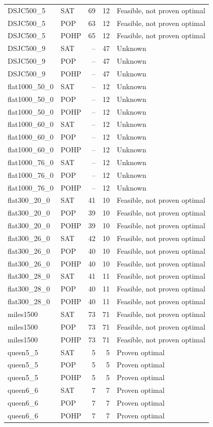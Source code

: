 \begin{longtable}{llrrl}
DSJC500\_5 & SAT & 69 & 12 & Feasible, not proven optimal \\
DSJC500\_5 & POP & 63 & 12 & Feasible, not proven optimal \\
DSJC500\_5 & POHP & 65 & 12 & Feasible, not proven optimal \\
DSJC500\_9 & SAT & -- & 47 & Unknown \\
DSJC500\_9 & POP & -- & 47 & Unknown \\
DSJC500\_9 & POHP & -- & 47 & Unknown \\
flat1000\_50\_0 & SAT & -- & 12 & Unknown \\
flat1000\_50\_0 & POP & -- & 12 & Unknown \\
flat1000\_50\_0 & POHP & -- & 12 & Unknown \\
flat1000\_60\_0 & SAT & -- & 12 & Unknown \\
flat1000\_60\_0 & POP & -- & 12 & Unknown \\
flat1000\_60\_0 & POHP & -- & 12 & Unknown \\
flat1000\_76\_0 & SAT & -- & 12 & Unknown \\
flat1000\_76\_0 & POP & -- & 12 & Unknown \\
flat1000\_76\_0 & POHP & -- & 12 & Unknown \\
flat300\_20\_0 & SAT & 41 & 10 & Feasible, not proven optimal \\
flat300\_20\_0 & POP & 39 & 10 & Feasible, not proven optimal \\
flat300\_20\_0 & POHP & 39 & 10 & Feasible, not proven optimal \\
flat300\_26\_0 & SAT & 42 & 10 & Feasible, not proven optimal \\
flat300\_26\_0 & POP & 40 & 10 & Feasible, not proven optimal \\
flat300\_26\_0 & POHP & 40 & 10 & Feasible, not proven optimal \\
flat300\_28\_0 & SAT & 41 & 11 & Feasible, not proven optimal \\
flat300\_28\_0 & POP & 40 & 11 & Feasible, not proven optimal \\
flat300\_28\_0 & POHP & 40 & 11 & Feasible, not proven optimal \\
miles1500 & SAT & 73 & 71 & Feasible, not proven optimal \\
miles1500 & POP & 73 & 71 & Feasible, not proven optimal \\
miles1500 & POHP & 73 & 71 & Feasible, not proven optimal \\
queen5\_5 & SAT & 5 & 5 & Proven optimal \\
queen5\_5 & POP & 5 & 5 & Proven optimal \\
queen5\_5 & POHP & 5 & 5 & Proven optimal \\
queen6\_6 & SAT & 7 & 7 & Proven optimal \\
queen6\_6 & POP & 7 & 7 & Proven optimal \\
queen6\_6 & POHP & 7 & 7 & Proven optimal \\
\end{longtable}
